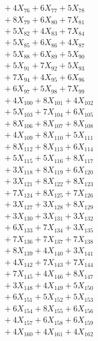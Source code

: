 \documentclass[a4paper,10pt]{article}
\begin{document}
{\begin{align}
&\;  + 4 X_{76} + 6 X_{77} + 5 X_{78} \\[0.3ex]
&\;  + 8 X_{79} + 6 X_{80} + 7 X_{81} \\[0.3ex]
&\;  + 5 X_{82} + 4 X_{83} + 7 X_{84} \\[0.3ex]
&\;  + 5 X_{85} + 6 X_{86} + 4 X_{87} \\[0.3ex]
&\;  + 5 X_{88} + 6 X_{89} + 5 X_{90} \\[0.3ex]
&\;  + 5 X_{91} + 7 X_{92} + 5 X_{93} \\[0.3ex]
&\;  + 7 X_{94} + 4 X_{95} + 6 X_{96} \\[0.3ex]
&\;  + 6 X_{97} + 5 X_{98} + 7 X_{99} \\[0.5ex]\allowbreak
&\;  + 4 X_{100} + 8 X_{101} + 4 X_{102} \\[0.3ex]
&\;  + 5 X_{103} + 7 X_{104} + 6 X_{105} \\[0.3ex]
&\;  + 8 X_{106} + 8 X_{107} + 8 X_{108} \\[0.3ex]
&\;  + 4 X_{109} + 8 X_{110} + 5 X_{111} \\[0.3ex]
&\;  + 8 X_{112} + 8 X_{113} + 6 X_{114} \\[0.3ex]
&\;  + 5 X_{115} + 5 X_{116} + 8 X_{117} \\[0.3ex]
&\;  + 3 X_{118} + 8 X_{119} + 6 X_{120} \\[0.3ex]
&\;  + 3 X_{121} + 8 X_{122} + 8 X_{123} \\[0.3ex]
&\;  + 7 X_{124} + 8 X_{125} + 7 X_{126} \\[0.3ex]
&\;  + 3 X_{127} + 3 X_{128} + 8 X_{129} \\[0.5ex]\allowbreak
&\;  + 3 X_{130} + 3 X_{131} + 3 X_{132} \\[0.3ex]
&\;  + 6 X_{133} + 7 X_{134} + 3 X_{135} \\[0.3ex]
&\;  + 7 X_{136} + 7 X_{137} + 7 X_{138} \\[0.3ex]
&\;  + 8 X_{139} + 4 X_{140} + 3 X_{141} \\[0.3ex]
&\;  + 4 X_{142} + 7 X_{143} + 7 X_{144} \\[0.3ex]
&\;  + 7 X_{145} + 4 X_{146} + 8 X_{147} \\[0.3ex]
&\;  + 3 X_{148} + 4 X_{149} + 5 X_{150} \\[0.3ex]
&\;  + 6 X_{151} + 5 X_{152} + 5 X_{153} \\[0.3ex]
&\;  + 6 X_{154} + 8 X_{155} + 6 X_{156} \\[0.3ex]
&\;  + 4 X_{157} + 6 X_{158} + 6 X_{159} \\[0.5ex]\allowbreak
&\;  + 4 X_{160} + 4 X_{161} + 4 X_{162} \\[0.3ex]

\end{align}}
\end{document}
